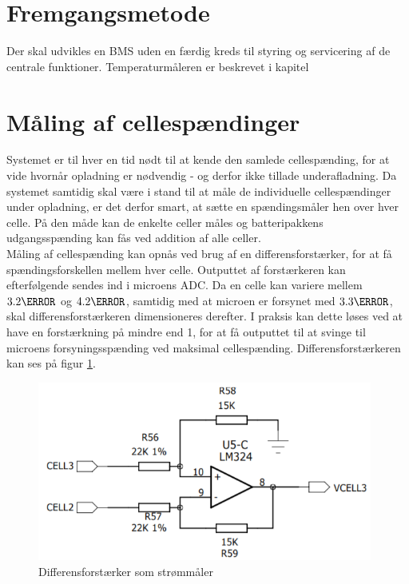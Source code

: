 \section{Fremgangsmetode}
Der skal udvikles en BMS uden en færdig kreds til styring og servicering af de centrale funktioner. Temperaturmåleren er beskrevet i kapitel 


\section{Måling af cellespændinger}
Systemet er til hver en tid nødt til at kende den samlede cellespænding, for at vide hvornår opladning er nødvendig - og derfor ikke tillade underafladning. Da systemet samtidig skal være i stand til at måle de individuelle cellespændinger under opladning, er det derfor smart, at sætte en spændingsmåler hen over hver celle. På den måde kan de enkelte celler måles og batteripakkens udgangsspænding kan fås ved addition af alle celler.
\\

Måling af cellespænding kan opnås ved brug af en differensforstærker, for at få spændingsforskellen mellem hver celle. Outputtet af forstærkeren kan efterfølgende sendes ind i microens ADC. Da en celle kan variere mellem $3.2\volt$ og $4.2\volt$, samtidig med at microen er forsynet med $3.3\volt$, skal differensforstærkeren dimensioneres derefter. I praksis kan dette løses ved at have en forstærkning på mindre end 1, for at få outputtet til at svinge til microens forsyningsspænding ved maksimal cellespænding. Differensforstærkeren kan ses på figur \ref{fig:cell_voltage}.
\\

\begin{figure}[h]
	\centering
	\includegraphics[width=11cm]{billeder/cell_voltage.png}
	\caption{Differensforstærker som strømmåler}
	\label{fig:cell_voltage}
\end{figure}

